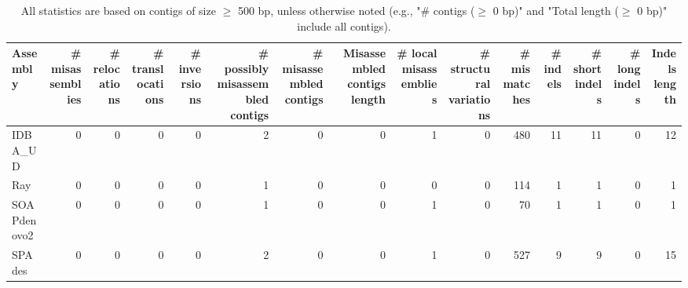 \documentclass[12pt,a4paper]{article}
\begin{document}
\begin{table}[ht]
\begin{center}
\caption{All statistics are based on contigs of size $\geq$ 500 bp, unless otherwise noted (e.g., "\# contigs ($\geq$ 0 bp)" and "Total length ($\geq$ 0 bp)" include all contigs).}
\begin{tabular}{|l*{14}{|r}|}
\hline
Assembly & \# misassemblies &     \# relocations &     \# translocations &     \# inversions & \# possibly misassembled contigs & \# misassembled contigs & Misassembled contigs length & \# local misassemblies & \# structural variations & \# mismatches & \# indels &     \# short indels &     \# long indels & Indels length \\ \hline
IDBA\_UD & 0 & 0 & 0 & 0 & 2 & 0 & 0 & 1 & 0 & 480 & 11 & 11 & 0 & 12 \\ \hline
Ray & 0 & 0 & 0 & 0 & 1 & 0 & 0 & 0 & 0 & 114 & 1 & 1 & 0 & 1 \\ \hline
SOAPdenovo2 & 0 & 0 & 0 & 0 & 1 & 0 & 0 & 1 & 0 & 70 & 1 & 1 & 0 & 1 \\ \hline
SPAdes & 0 & 0 & 0 & 0 & 2 & 0 & 0 & 1 & 0 & 527 & 9 & 9 & 0 & 15 \\ \hline
\end{tabular}
\end{center}
\end{table}
\end{document}

